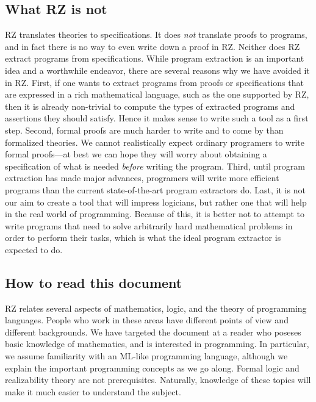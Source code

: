 \subsection*{What RZ is not}
\label{sec:what-rz-not}

RZ translates theories to specifications. It does \emph{not} translate
proofs to programs, and in fact there is no way to even write down a
proof in RZ. Neither does RZ extract programs from specifications.
While program extraction is an important idea and a worthwhile
endeavor, there are several reasons why we have avoided it in RZ.
First, if one wants to extract programs from proofs or specifications
that are expressed in a rich mathematical language, such as the one
supported by RZ, then it is already non-trivial to compute the types
of extracted programs and assertions they should satisfy. Hence it
makes sense to write such a tool as a first step. Second, formal
proofs are much harder to write and to come by than formalized
theories. We cannot realistically expect ordinary programers to write
formal proofs---at best we can hope they will worry about obtaining a
specification of what is needed \emph{before} writing the program.
Third, until program extraction has made major advances, programers
will write more efficient programs than the current state-of-the-art
program extractors do. Last, it is not our aim to create a tool that
will impress logicians, but rather one that will help in the real
world of programming. Because of this, it is better not to attempt to
write programs that need to solve arbitrarily hard mathematical
problems in order to perform their tasks, which is what the ideal
program extractor is expected to do.


\subsection*{How to read this document}
\label{sec:how-read-this}

RZ relates several aspects of mathematics, logic, and the theory of
programming languages. People who work in these areas have different
points of view and different backgrounds. We have targeted the
document at a reader who poseses basic knowledge of mathematics, and
is interested in programming. In particular, we assume familiarity
with an ML-like programming language, although we explain the
important programming concepts as we go along. Formal logic and
realizability theory are not prerequisites. Naturally, knowledge of
these topics will make it much easier to understand the subject.

